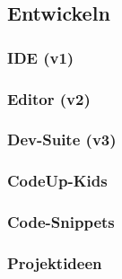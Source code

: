 \documentclass[main.tex]{subfiles}
\begin{document}
    \subsection{Entwickeln}
    \subsubsection{IDE (v1)}
    \subsubsection{Editor (v2)}
    \subsubsection{Dev-Suite (v3)}
    \subsubsection{CodeUp-Kids}
    \subsubsection{Code-Snippets}
    \subsubsection{Projektideen}
\end{document}
